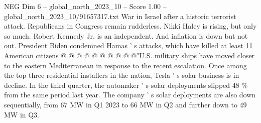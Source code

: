 \begin{textsample}{NEG Dim 6 – global\_north\_2023\_10 – Score 1.00 – global\_north\_2023\_10/91657317.txt}
War in Israel after a historic terrorist attack.
Republicans in Congress remain rudderless.
Nikki Haley is rising, but only so much.
Robert Kennedy Jr. is an independent.
And inflation is down but not out.
President Biden condemned Hamas ' s attacks, which have killed at least 11 American citizens @ @ @ @ @ @ @ @ @ @"U.S. military ships have moved closer to the eastern Mediterranean in response to the recent escalation.
Once among the top three residential installers in the nation, Tesla ' s solar business is in decline.
In the third quarter, the automaker ' s solar deployments slipped 48 \% from the same period last year.
The company ' s solar deployments are also down sequentially, from 67 MW in Q1 2023 to 66 MW in Q2 and further down to 49 MW in Q3.

\end{textsample}
